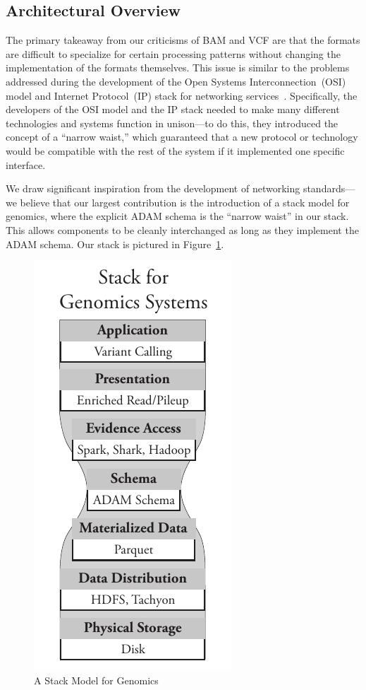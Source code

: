 \documentclass{bioinfo}
\begin{document}
\subsection{Architectural Overview}
\label{sec:architectural-overview}

The primary takeaway from our criticisms of BAM and VCF are that the formats are difficult to specialize for certain processing patterns without
changing the implementation of the formats themselves. This issue is similar to the problems addressed during the development of the Open
Systems Interconnection~(OSI) model and Internet Protocol~(IP) stack for networking services~\citep{zimmermann80}. Specifically, the developers
of the OSI model and the IP stack needed to make many different technologies and systems function in unison---to do this, they introduced the
concept of a ``narrow waist,'' which guaranteed that a new protocol or technology would be compatible with the rest of the system if it implemented
one specific interface.

We draw significant inspiration from the development of networking standards---we believe that our largest contribution is the introduction of a
stack model for genomics, where the explicit ADAM schema is the ``narrow waist'' in our stack. This allows components to be cleanly
interchanged as long as they implement the ADAM schema. Our stack is pictured in Figure~\ref{fig:stack-model}.

\begin{figure}[h]
\begin{center}
\includegraphics[width=0.4\linewidth]{stack-model.pdf}
\end{center}
\caption{A Stack Model for Genomics}
\label{fig:stack-model}
\end{figure}
\end{document}
